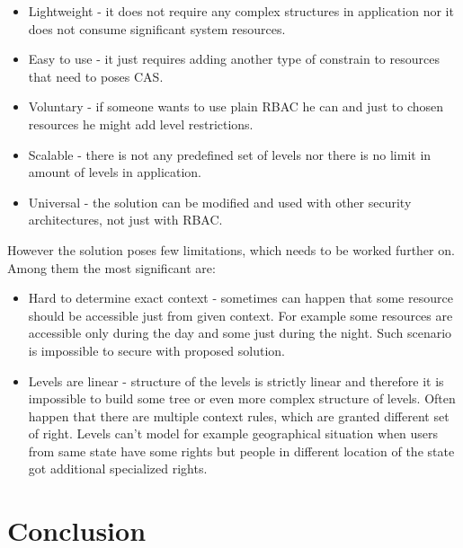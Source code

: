 \documentclass{poster15}
\begin{document}
\begin{itemize}  
\setlength{\itemsep}{1pt}
	 \setlength{\parskip}{0pt}
  \setlength{\parsep}{0pt}
  \item Lightweight - it does not require any complex structures in application nor it does not consume significant system resources. 
  \item Easy to use - it just requires adding another type of constrain to resources that need to poses CAS.
  
  \item Voluntary - if someone wants to use plain RBAC he can and just to chosen resources he might add level restrictions. 
  
  \item Scalable - there is not any predefined set of levels nor there is no limit in amount of levels in application.
  
  \item Universal - the solution can be modified and used with other security architectures, not just with RBAC.
\end{itemize}

However the solution poses few limitations, which needs to be worked further on. Among them the most significant are:
\begin{itemize}
		\setlength{\itemsep}{1pt}
	 \setlength{\parskip}{0pt}
  \setlength{\parsep}{0pt}

  \item Hard to determine exact context - sometimes can happen that some resource should be accessible just from given context. For example some resources are accessible only during the day and some just during the night. Such scenario is impossible to secure with proposed solution.
  
  \item Levels are linear - structure of the levels is strictly linear and therefore it is impossible to build some tree or even more complex structure of levels. Often happen that there are multiple context rules, which are granted different set of right. Levels can't model for example geographical situation when users from same state have some rights but people in different location of the state got additional specialized rights.
\end{itemize}

\section{Conclusion}
\end{document}
